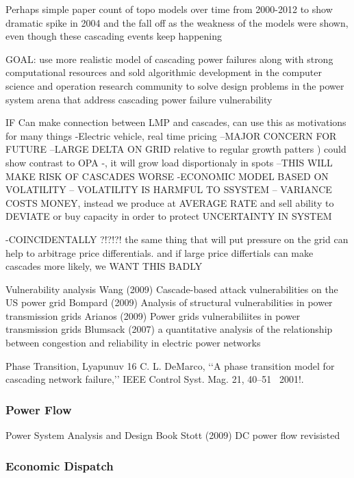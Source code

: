 Perhaps simple paper count of topo models over time from 2000-2012 to show dramatic spike in 2004 and the fall off as the weakness of the models were shown, even though these cascading events keep happening

GOAL: use more realistic model of cascading power failures along with strong computational resources and sold algorithmic development in the computer science and operation research community to solve design problems in the power system arena that address cascading power failure vulnerability


IF Can make connection between LMP and cascades, can use this as motivations for many things
-Electric vehicle, real time pricing
--MAJOR CONCERN FOR FUTURE
--LARGE DELTA ON GRID relative to regular growth patters )  could show contrast to OPA -, it will grow load disportionaly in spots
--THIS WILL MAKE RISK OF CASCADES WORSE
-ECONOMIC MODEL BASED ON VOLATILITY  -- VOLATILITY IS HARMFUL TO SSYSTEM  -- VARIANCE COSTS MONEY, instead we produce at AVERAGE RATE and sell ability to DEVIATE or buy capacity in order to protect UNCERTAINTY IN SYSTEM

-COINCIDENTALLY ?!?!?! the same thing that will put pressure on the grid can help to arbitrage price differentials.  and if large price differtials can make cascades more likely, we WANT THIS BADLY




Vulnerability analysis
Wang (2009) Cascade-based attack vulnerabilities on the US power grid
Bompard (2009) Analysis of structural vulnerabilities in power transmission grids
Arianos (2009) Power grids vulnerabiliites in power transmission grids
Blumsack (2007) a quantitative analysis of the relationship between congestion and reliability in electric power networks


Phase Transition, Lyapunuv
16 C. L. DeMarco, ‘‘A phase transition model for cascading network failure,’’
IEEE Control Syst. Mag. 21, 40–51 ~2001!.


\subsubsection{Power Flow}
Power System Analysis and Design Book \cite{glover_2008}
Stott (2009) DC power flow revisisted \cite{stott_2009}

\subsubsection{Economic Dispatch}


